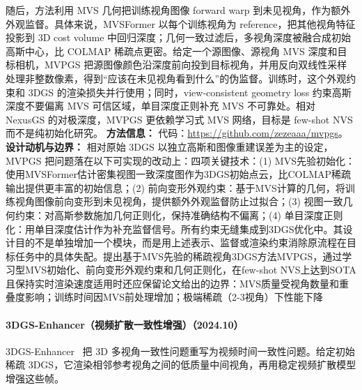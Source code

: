 随后，方法利用 MVS 几何把训练视角图像 forward warp 到未见视角，作为额外外观监督。具体来说，MVSFormer 以每个训练视角为 reference，把其他视角特征投影到 3D cost volume 中回归深度；几何一致过滤后，多视角深度被融合成初始高斯中心，比 COLMAP 稀疏点更密。给定一个源图像、源视角 MVS 深度和目标相机，MVPGS 把源图像颜色沿深度前向投到目标视角，并用反向双线性采样处理非整数像素，得到“应该在未见视角看到什么”的伪监督。训练时，这个外观约束和 3DGS 的渲染损失并行使用；同时，view-consistent geometry loss 约束高斯深度不要偏离 MVS 可信区域，单目深度正则补充 MVS 不可靠处。相对 NexusGS 的对极深度，MVPGS 更依赖学习式 MVS 网络，目标是 few-shot NVS 而不是纯初始化研究。
\textbf{方法信息：} 代码：\url{https://github.com/zezeaaa/mvpgs}。
\textbf{设计动机与边界：} 相对原始 3DGS 以独立高斯和图像重建误差为主的设定，MVPGS 把问题落在以下可实现的改动上：四项关键技术：(1) MVS先验初始化：使用MVSFormer估计密集视图一致深度图作为3DGS初始点云，比COLMAP稀疏输出提供更丰富的初始信息；(2) 前向变形外观约束：基于MVS计算的几何，将训练视角图像前向变形到未见视角，提供额外外观监督防止过拟合；(3) 视图一致几何约束：对高斯参数施加几何正则化，保持准确结构不偏离；(4) 单目深度正则化：用单目深度估计作为补充监督信号。所有约束无缝集成到3DGS优化中。其设计目的不是单独增加一个模块，而是用上述表示、监督或渲染约束消除原流程在目标任务中的具体失配。提出基于MVS先验的稀疏视角3DGS方法MVPGS，通过学习型MVS初始化、前向变形外观约束和几何正则化，在few-shot NVS上达到SOTA且保持实时渲染速度适用时还应保留论文给出的边界：MVS质量受视角数量和重叠度影响；训练时间因MVS前处理增加；极端稀疏（2-3视角）下性能下降
\paragraph{3DGS-Enhancer（视频扩散一致性增强）（2024.10）}
3DGS-Enhancer~\cite{2410_16266} 把 3D 多视角一致性问题重写为视频时间一致性问题。给定初始稀疏 3DGS，它渲染相邻参考视角之间的低质量中间视角，再用稳定视频扩散模型增强这些帧。

